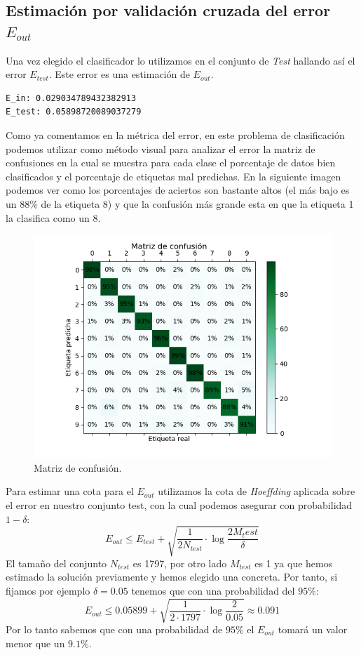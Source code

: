 \documentclass[size=a4, parskip=half, titlepage=false, toc=flat, toc=bib, 12pt]{scrartcl}
\begin{document}
\subsection{Estimación por validación cruzada del error $E_{out}$}
Una vez elegido el clasificador lo utilizamos en el conjunto de \textit{Test} hallando así el error $E_{test}$. Este error es una estimación de $E_{out}$.
\begin{verbatim}
E_in: 0.029034789432382913
E_test: 0.05898720089037279
\end{verbatim}
Como ya comentamos en la métrica del error, en este problema de clasificación podemos utilizar como método visual para analizar el error la matriz de confusiones en la cual se muestra para cada clase el porcentaje de datos bien clasificados y el porcentaje de etiquetas mal predichas. En la siguiente imagen podemos ver como los porcentajes de aciertos son bastante altos (el más bajo es un 88\% de la etiqueta 8) y que la confusión más grande esta en que la etiqueta 1 la clasifica como un 8.
\begin{figure}[H]
\centering
\includegraphics[width=1\textwidth]{./img/confusion}
\caption{Matriz de confusión.}
\end{figure}

Para estimar una cota para el $E_{out}$ utilizamos la cota de \textit{Hoeffding} aplicada sobre el error en nuestro conjunto test, con la cual podemos asegurar con probabilidad $1 - \delta$:
$$E_{out} \leq E_{test} + \sqrt{ \frac{1}{2 N_{test}} \cdot \log \frac{2 M_test}{\delta}} $$
El tamaño del conjunto $N_{test}$ es 1797, por otro lado $M_{test}$ es 1 ya que hemos estimado la solución previamente y hemos elegido una concreta. Por tanto, si fijamos por ejemplo $\delta = 0.05$ tenemos que con una probabilidad del $95\%$:
$$ E_{out} \leq 0.05899 + \sqrt{ \frac{1}{2 \cdot 1797} \cdot \log \frac{2}{0.05}} \approx 0.091$$
Por lo tanto sabemos que con una probabilidad de $95\%$ el $E_{out}$ tomará un valor menor que un $9.1\%$.
\end{document}
